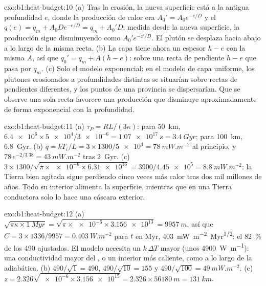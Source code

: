 \begin{solution}{exo:b1:heat-budget:10}
(a) Tras la erosión, la nueva superficie está a la antigua profundidad $e$, donde la
producción de calor era $A_0' = A_0e^{-e/D}$ y el  $q(e) = q_m +
A_0De^{-e/D} = q_m + A_0'D$; medida desde la nueva superficie, la producción
sigue disminuyendo como $A_0'e^{-z'/D}$. El plutón se desplaza hacia abajo a lo largo de la misma recta.
(b) La capa tiene ahora un espesor $h - e$ con la misma $A$, así que $q_0' = q_m + A(h - e)$:
sobre una recta de pendiente $h - e$ que pasa por $q_m$. (c) Solo el modelo exponencial: en el
modelo de capa uniforme, los plutones erosionados a profundidades distintas se situarían sobre rectas de
pendientes diferentes, y los puntos de una provincia se dispersarían. Que se observe una
sola recta favorece una producción que disminuye aproximadamente de forma exponencial con la
profundidad.
\end{solution}

\begin{solution}{exo:b1:heat-budget:11}
(a) $\tau_P = RL/(3\kappa)$: para \qty{50}{km}, $\num{6.4e6}\times\num{5e4}/\num{3e-6}
= \qty{1.07e17}{s} = \qty{3.4}{Gyr}$; para \qty{100}{km}, \qty{6.8}{Gyr}.
(b) $q = kT_i/L = 3\times1300/\num{5e4} = \qty{78}{mW.m^{-2}}$ al principio,
y $78\,e^{-2/3.38} = \qty{43}{mW.m^{-2}}$ tras \qty{2}{Gyr}. (c)
$3\times1300/\sqrt{\pi\times\num{e-6}\times\num{6.31e16}} = 3900/\num{4.45e5} =
\qty{8.8}{mW.m^{-2}}$: la Tierra bien agitada sigue perdiendo cinco veces más calor
tras dos mil millones de años. Todo su interior alimenta la superficie, mientras que en una
Tierra conductora solo lo hace una cáscara exterior.
\end{solution}

\begin{solution}{exo:b1:heat-budget:12}
(a) $\sqrt{\pi\kappa\times\qty{1}{Myr}} = \sqrt{\pi\times\num{e-6}\times\num{3.156e13}}
= \qty{9957}{m}$, así que $C = 3\times1336/9957 = \qty{0.403}{W.m^{-2}}$ para
$t$ en Myr, \qty{403}{mW.m^{-2}.Myr^{1/2}}: el \qty{82}{\percent} de los 490 ajustados. El
modelo necesita un $k\,\Delta T$ mayor (unos \qty{4900}{W.m^{-1}}): una conductividad
mayor del , o un interior más caliente, como a lo largo de la adiabática.
(b) $490/\sqrt1 = 490$, $490/\sqrt{10} = 155$ y $490/\sqrt{100} =
\qty{49}{mW.m^{-2}}$. (c) $z = 2.326\sqrt{\num{e-6}\times\num{3.156e15}} =
2.326\times\qty{56180}{m} = \qty{131}{km}$.
\end{solution}

